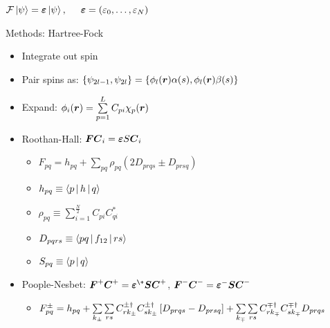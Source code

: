 \documentclass[10pt, t]{beamer}
\begin{document}
{
\begin{frame}[standout]
    $\mathcal{F}\ket{\psi} = \boldsymbol{{\varepsilon}}\ket{\psi},\hspace{0.5cm}
    \boldsymbol{{\varepsilon}}=(\varepsilon_0,\dots,\varepsilon_N)$
\end{frame}}

\begin{frame}[fragile]{Methods: Hartree-Fock}
    \begin{itemize}[<+->]
        \item Integrate out spin
        \item Pair spins as: $\{\psi_{2l-1}, \psi_{2l}\} =
            \{\phi_l(\boldsymbol{{r}})\alpha(s),\phi_l(\boldsymbol{{r}})\beta(s)\}$
        \item Expand: $\phi_i(\boldsymbol{{r}}) = \sum\limits^L_{p=1} C_{pi}\chi_p(\boldsymbol{{r}})$
        \item Roothan-Hall: $\boldsymbol{{F}}\boldsymbol{{C}}_i = \boldsymbol{{\varepsilon}}S\boldsymbol{{C}}_i$
            \begin{itemize}[<4->]
                \item $F_{pq} = h_{pq} + \sum\limits_{pq}\rho_{pq}\left(2D_{prqs} \pm D_{prsq}\right)$
                \vsp
                \item $h_{pq} \equiv \Braket{p | h | q}$
                \vsp
                \item $\rho_{pq} \equiv \sum\limits^{\frac{N}{2}}_{i=1} C_{pi}C^{*}_{qi}$
                \vsp
                \item $D_{pqrs} \equiv \Braket{pq | f_{12} | rs}$
                \item $S_{pq} \equiv \Braket{p | q}$
            \end{itemize}
        \item Poople-Nesbet: $\blds{F}^{+}\blds{C}^{+} =
            \blds{\veps}^{\+}\blds{S}\blds{C}^{+}$, $\boldsymbol{{F}}^{-}\boldsymbol{{C}}^{-} =
            \boldsymbol{{\varepsilon}}^{-}\boldsymbol{{S}}\boldsymbol{{C}}^{-}$
            \begin{itemize}[<5->]
                \item $F^{\pm}_{pq} = h_{pq} + \sum\limits_{k_{\pm}}\sum\limits_{rs}
                    C^{\pm\dagger}_{rk_{\pm}} C^{\pm\dagger}_{sk_{\pm}}
                    \left[D_{prqs} - D_{prsq}\right] +
                    \sum\limits_{k_{\mp}}\sum\limits_{rs} C^{\mp\dagger}_{rk_{\mp}}
                    C^{\mp\dagger}_{sk_{\mp}} D_{prqs}$
            \end{itemize}
    \end{itemize}
\end{frame}
\end{document}
